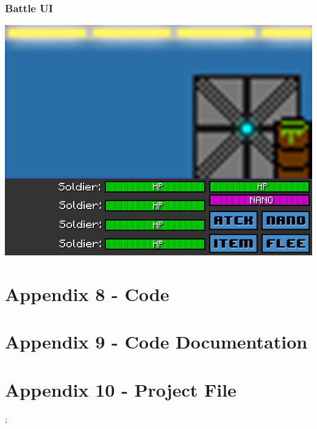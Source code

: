 \documentclass{article}
\begin{document}
\subsubsection{Battle UI}
\includegraphics[scale=0.5]{./references/sprites/battleUi.png}	


\section{Appendix 8 - Code}


\section{Appendix 9 - Code Documentation}


\section{Appendix 10 - Project File}
;
\end{document}
